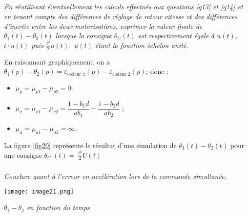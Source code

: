 \begin{multicols}{2}
\subparagraph{}\textit{En réutilisant éventuellement les calculs effectués aux questions \ref{q13} et \ref{q14} et en
  tenant compte des différences de réglage de retour vitesse et des
  différences d'inertie entre les deux motorisations, exprimer la valeur
  finale de $\theta_1(t)-\theta_2(t)$ lorsque la consigne $\theta_C(t)$ est respectivement
  égale à $u(t)$, $t\cdot u(t)$ puis \(\frac{t^{2}}{2}u(t),\) $u(t)$ étant la
  fonction échelon unité.}
\ifprof
\begin{corrige}
En raisonnant graphiquement, on a $\theta_1(p)- \theta_2(p)=\varepsilon_{\text{codeur 1}}(p)- \varepsilon_{\text{codeur 2}}(p)$; donc : 
\begin{itemize}
\item $\mu_p = \mu_{p1}-\mu_{p2} = 0$;
\item $\mu_v = \mu_{v1}-\mu_{v2} = \dfrac{1-b_1d}{ab_1}-\dfrac{1-b_2d}{ab_2} $ ;
\item $\mu_a = \mu_{a1}-\mu_{a2} = \infty$.
\end{itemize}
\end{corrige}
\else
\fi

La figure \ref{fig20} représente le résultat d'une simulation de
$\theta_1(t)-\theta_2(t)$ pour une
consigne \(\theta_{C}\ \left( t \right) = \ \frac{t^{2}}{2}U(t)\)

\subparagraph{}\textit{Conclure quant à l'erreur en accélération lors de la commande
  simultanée.}
\ifprof
\begin{corrige}
\end{corrige}
\else
\fi

\ifprof
\else


\begin{center}
\texttt{[image: image21.png]}

\textit{$\theta_1-\theta_2$ en
fonction du temps \label{fig20}}
\end{center}
\fi

\ifprof
\else

\end{multicols}
